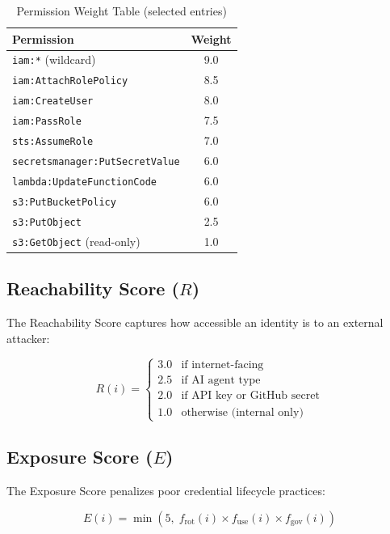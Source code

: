 \documentclass[conference]{IEEEtran}
\begin{document}
\begin{table}[h]
\caption{Permission Weight Table (selected entries)}
\label{tab:permission_weights}
\centering
\begin{tabular}{lc}
\toprule
\textbf{Permission} & \textbf{Weight} \\
\midrule
\texttt{iam:*} (wildcard) & 9.0 \\
\texttt{iam:AttachRolePolicy} & 8.5 \\
\texttt{iam:CreateUser} & 8.0 \\
\texttt{iam:PassRole} & 7.5 \\
\texttt{sts:AssumeRole} & 7.0 \\
\texttt{secretsmanager:PutSecretValue} & 6.0 \\
\texttt{lambda:UpdateFunctionCode} & 6.0 \\
\texttt{s3:PutBucketPolicy} & 6.0 \\
\texttt{s3:PutObject} & 2.5 \\
\texttt{s3:GetObject} (read-only) & 1.0 \\
\bottomrule
\end{tabular}
\end{table}

\subsection{Reachability Score ($R$)}

The Reachability Score captures how accessible an identity is to an external
attacker:

\begin{equation}
  R(i) = \begin{cases}
    3.0 & \text{if internet-facing} \\
    2.5 & \text{if AI agent type} \\
    2.0 & \text{if API key or GitHub secret} \\
    1.0 & \text{otherwise (internal only)}
  \end{cases}
  \label{eq:reachability}
\end{equation}

\subsection{Exposure Score ($E$)}

The Exposure Score penalizes poor credential lifecycle practices:

\begin{equation}
  E(i) = \min\!\left(5,\; f_{\text{rot}}(i) \times f_{\text{use}}(i)
         \times f_{\text{gov}}(i)\right)
  \label{eq:exposure}
\end{equation}
\end{document}
